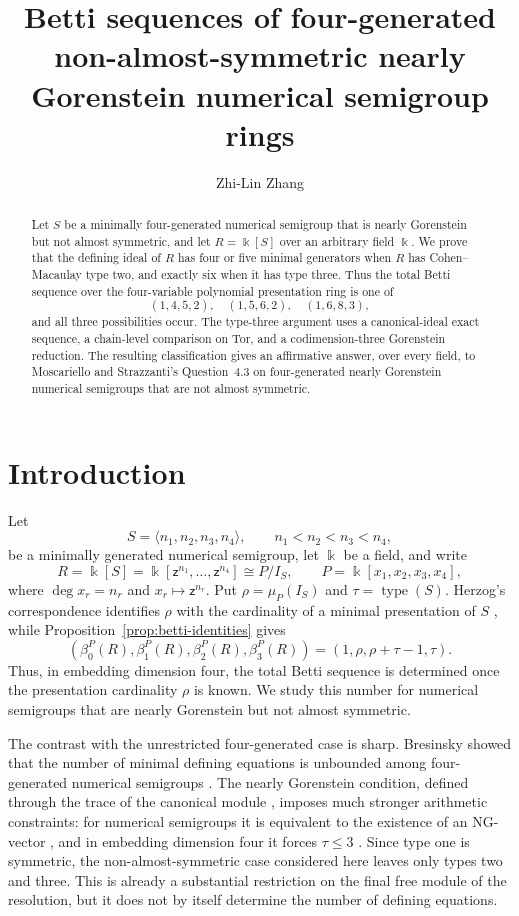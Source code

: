 \documentclass[10pt]{amsart}
\title[4-gen. non-almost-symmetric nearly Gorenstein semigroup rings]
{Betti sequences of four-generated non-almost-symmetric nearly Gorenstein numerical semigroup rings}
\author{Zhi-Lin Zhang}
\theoremstyle{plain}
\begin{document}
\begin{abstract}
Let \(S\) be a minimally four-generated numerical semigroup that is nearly
Gorenstein but not almost symmetric, and let \(R=\Bbbk[S]\) over an arbitrary
field \(\Bbbk\).  We prove that the defining ideal of \(R\) has four or five
minimal generators when \(R\) has Cohen--Macaulay type two, and exactly six
when it has type three.  Thus the total Betti sequence over the
four-variable polynomial presentation ring is one of
\[
(1,4,5,2),\quad (1,5,6,2),\quad (1,6,8,3),
\]
and all three possibilities occur.  The type-three argument uses a
canonical-ideal exact sequence, a chain-level comparison on Tor, and a
codimension-three Gorenstein reduction.  The resulting classification gives
an affirmative answer, over every field, to Moscariello and Strazzanti's
Question~4.3 on four-generated nearly Gorenstein numerical semigroups that
are not almost symmetric.
\end{abstract}

\maketitle

\section{Introduction}

Let
\[
S=\langle n_1,n_2,n_3,n_4\rangle,
\qquad n_1<n_2<n_3<n_4,
\]
be a minimally generated numerical semigroup, let \(\Bbbk\) be a field, and
write
\[
R=\Bbbk[S]
 =\Bbbk[\mathsf z^{n_1},\ldots,\mathsf z^{n_4}]
 \cong P/I_S,
\qquad
P=\Bbbk[x_1,x_2,x_3,x_4],
\]
where \(\deg x_r=n_r\) and \(x_r\mapsto\mathsf z^{n_r}\).  Put
\(\rho=\mu_P(I_S)\) and \(\tau=\operatorname{type}(S)\).  Herzog's
correspondence identifies \(\rho\) with the cardinality of a minimal
presentation of \(S\) \cite[Proposition~1.5]{Herzog70}, while
Proposition~\ref{prop:betti-identities} gives
\[
(\beta_0^P(R),\beta_1^P(R),\beta_2^P(R),\beta_3^P(R))
=(1,\rho,\rho+\tau-1,\tau).
\]
Thus, in embedding dimension four, the total Betti sequence is determined
once the presentation cardinality \(\rho\) is known.  We study this number
for numerical semigroups that are nearly Gorenstein but not almost
symmetric.

The contrast with the unrestricted four-generated case is sharp.  Bresinsky
showed that the number of minimal defining equations is unbounded among
four-generated numerical semigroups \cite{BresinskyPrime75}.  The nearly
Gorenstein condition, defined through the trace of the canonical module
\cite{HHS19}, imposes much stronger arithmetic constraints: for numerical
semigroups it is equivalent to the existence of an NG-vector
\cite[Definition~1.2 and Proposition~1.1]{MS21}, and in embedding dimension
four it forces \(\tau\le3\) \cite[Theorem~2.4]{MS21}.  Since type one is
symmetric, the non-almost-symmetric case considered here leaves only types
two and three.  This is already a substantial restriction on the final free
module of the resolution, but it does not by itself determine the number of
defining equations.
\end{document}
